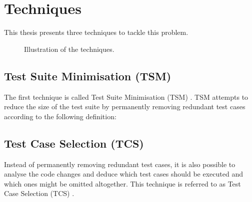 \section{Techniques}
\noindent This thesis presents three techniques to tackle this problem.

\begin{figure*}[t]
	\centering
	\hfill
	\hfill
	\caption{Illustration of the techniques.}
\end{figure*}

\subsection{Test Suite Minimisation (TSM)}
\noindent The first technique is called Test Suite Minimisation (TSM) \cite{10.1002/stv.430}. TSM attempts to reduce the size of the test suite by permanently removing redundant test cases according to the following definition:\\

\noindent{}

\subsection{Test Case Selection (TCS)}
\noindent Instead of permanently removing redundant test cases, it is also possible to analyse the code changes and deduce which test cases should be executed and which ones might be omitted altogether. This technique is referred to as Test Case Selection (TCS) \cite{10.1002/stv.430}.\\


